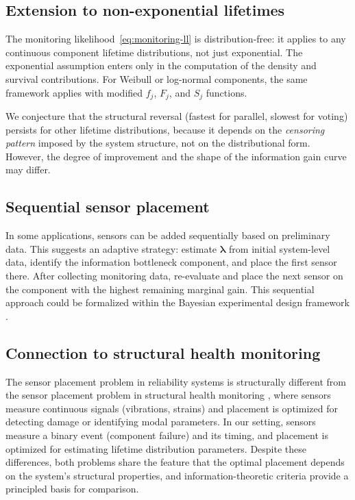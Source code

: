 \documentclass[12pt]{article}
\theoremstyle{definition}
\theoremstyle{remark}
\newcommand{\blam}{\boldsymbol{\lambda}}
\begin{document}
\subsection{Extension to non-exponential lifetimes}
\label{sec:nonexponential}

The monitoring likelihood~\eqref{eq:monitoring-ll} is
distribution-free: it applies to any continuous component lifetime
distributions, not just exponential.  The exponential assumption
enters only in the computation of the density and survival
contributions.  For Weibull or log-normal components, the same
framework applies with modified $f_j$, $F_j$, and $S_j$ functions.

We conjecture that the structural reversal (fastest for parallel,
slowest for voting) persists for other lifetime distributions,
because it depends on the \emph{censoring pattern} imposed by the
system structure, not on the distributional form.  However, the
degree of improvement and the shape of the information gain curve may
differ.

\subsection{Sequential sensor placement}
\label{sec:sequential}

In some applications, sensors can be added sequentially based on
preliminary data.  This suggests an adaptive strategy: estimate
$\blam$ from initial system-level data, identify the information
bottleneck component, and place the first sensor there.  After
collecting monitoring data, re-evaluate and place the next sensor on
the component with the highest remaining marginal gain.  This
sequential approach could be formalized within the Bayesian
experimental design framework \citep{ChalonderVerdinelli1995}.

\subsection{Connection to structural health monitoring}
\label{sec:shm}

The sensor placement problem in reliability systems is structurally
different from the sensor placement problem in structural health
monitoring \citep{OstachowiczSoman2019, Papadimitriou2004}, where
sensors measure continuous signals (vibrations, strains) and
placement is optimized for detecting damage or identifying modal
parameters.  In our setting, sensors measure a binary event (component
failure) and its timing, and placement is optimized for estimating
lifetime distribution parameters.  Despite these differences, both
problems share the feature that the optimal placement depends on the
system's structural properties, and information-theoretic criteria
provide a principled basis for comparison.
\end{document}
